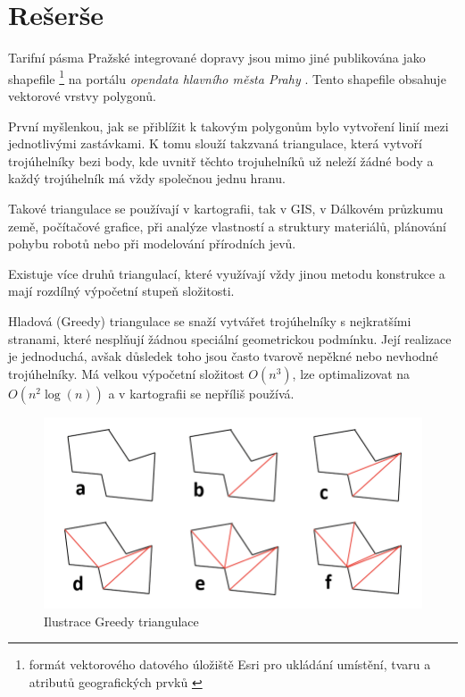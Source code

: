\chapter{Rešerše}
\label{0-reserse}

Tarifní pásma Pražské integrované dopravy jsou mimo jiné publikována jako shapefile 
\footnote{formát vektorového datového úložiště Esri pro ukládání umístění,
tvaru a atributů geografických prvků \cite{shapefile}}
na portálu \textit{opendata hlavního města Prahy} \cite{opendata}. Tento shapefile
obsahuje vektorové vrstvy polygonů.

První myšlenkou, jak se přiblížit k takovým polygonům bylo vytvoření linií mezi jednotlivými zastávkami.
K tomu slouží takzvaná triangulace, která vytvoří trojúhelníky bezi body, kde uvnitř těchto trojuhelníků  
už neleží žádné body a každý trojúhelník má vždy společnou jednu hranu. 

Takové triangulace se používají v kartografii, tak v GIS, v Dálkovém průzkumu země,
počítačové grafice, při analýze vlastností a struktury materiálů, plánování pohybu robotů
nebo při modelování přírodních jevů. \cite{bayer-delaunay}

Existuje více druhů triangulací, které využívají vždy jinou metodu konstrukce
a mají rozdílný výpočetní stupeň složitosti. 

Hladová (Greedy) triangulace se snaží vytvářet trojúhelníky s nejkratšími stranami,
které nesplňují žádnou speciální geometrickou podmínku. Její realizace je jednoduchá,
avšak důsledek toho jsou často tvarově nepěkné nebo nevhodné trojúhelníky. Má velkou výpočetní
složitost \(O(n^3)\), lze optimalizovat na \(O(n^2 \log(n))\) a v kartografii se 
nepříliš používá. \cite{vanicek}

\begin{figure}[H] \centering
    \includegraphics[width=400pt]{./pictures/triangulace-greedy.png}
    \caption[Ilustrace Greedy triangulace]{Ilustrace Greedy triangulace \cite{triangulace-greedy}}
	\label{fig:triangulace-greedy}              
\end{figure}

